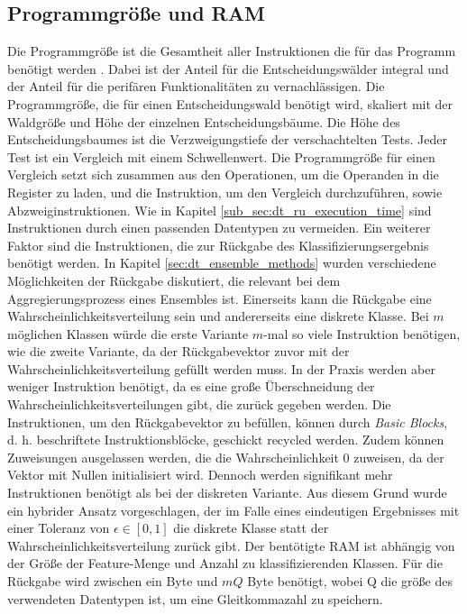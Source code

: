 \newpage
\subsection{Programmgröße und RAM}
\label{sub_sec:dt_ru_programm_size}
Die Programmgröße ist die Gesamtheit aller Instruktionen die für das Programm benötigt werden \cite{dymelThesis}.
Dabei ist der Anteil für die Entscheidungswälder integral und der Anteil für die perifären Funktionalitäten zu vernachlässigen.
Die Programmgröße, die für einen Entscheidungswald benötigt wird, skaliert mit der Waldgröße und Höhe der einzelnen Entscheidungsbäume.
\newline
\newline
Die Höhe des Entscheidungsbaumes ist die Verzweigungstiefe der verschachtelten Tests.
Jeder Test ist ein Vergleich mit einem Schwellenwert.
Die Programmgröße für einen Vergleich setzt sich zusammen aus den Operationen, um die Operanden in die Register zu laden,
und die Instruktion, um den Vergleich durchzuführen, sowie Abzweiginstruktionen. Wie in Kapitel \ref{sub_sec:dt_ru_execution_time}
sind Instruktionen durch einen passenden Datentypen zu vermeiden.
\newline
\newline
Ein weiterer Faktor sind die Instruktionen, die zur Rückgabe des Klassifizierungsergebnis benötigt werden.
In Kapitel \ref{sec:dt_ensemble_methods} wurden verschiedene Möglichkeiten der Rückgabe diskutiert, die relevant bei dem Aggregierungsprozess eines Ensembles ist.
Einerseits kann die Rückgabe eine Wahrscheinlichkeitsverteilung sein und andererseits eine diskrete Klasse.
Bei $m$ möglichen Klassen würde die erste Variante $m$-mal so viele Instruktion benötigen, wie die zweite Variante, da der Rückgabevektor zuvor mit der Wahrscheinlichkeitsverteilung gefüllt werden muss.
In der Praxis werden aber weniger Instruktion benötigt, da es eine große Überschneidung der Wahrscheinlichkeitsverteilungen gibt, die zurück gegeben werden.
Die Instruktionen, um den Rückgabevektor zu befüllen, können durch \textit{Basic Blocks}, d. h. beschriftete Instruktionsblöcke, geschickt recycled werden.
Zudem können Zuweisungen ausgelassen werden, die die Wahrscheinlichkeit 0 zuweisen, da der Vektor mit Nullen initialisiert wird.
Dennoch werden signifikant mehr Instruktionen benötigt als bei der diskreten Variante.
Aus diesem Grund wurde ein hybrider Ansatz vorgeschlagen, der im Falle eines eindeutigen Ergebnisses mit einer Toleranz von $\epsilon\in [0, 1]$ die diskrete Klasse statt der Wahrscheinlichkeitsverteilung zurück gibt.
\newline
\newline
Der bentötigte RAM ist abhängig von der Größe der Feature-Menge und Anzahl zu klassifizierenden Klassen.
Für die Rückgabe wird zwischen ein Byte und $mQ$ Byte benötigt, wobei Q die größe des verwendeten Datentypen ist, um eine Gleitkommazahl zu speichern.